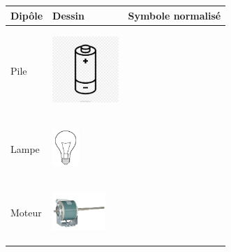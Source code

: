 \documentclass[11pt]{article}
\begin{document}
		\begin{center}
			
		\begin{tabular}{ |p{6cm}|p{6cm}|p{6cm}|  }
			\hline
			Dipôle 						& Dessin & Symbole normalisé \\\hline\hline
			Pile 						& 
			\begin{minipage}{.3\textwidth}
				\begin{center}
					\includegraphics[width=2.5cm]{pile.jpg}
				\end{center}
			  \end{minipage} &  \\\hline

			Lampe 	&
			\begin{minipage}{.3\textwidth}
				\begin{center}
					\includegraphics[width=1cm]{lampe.jpg}
				\end{center}
			  \end{minipage} &  \\\hline

			Moteur	& 
			\begin{minipage}{.3\textwidth}
				\begin{center}
					\includegraphics[width=2cm]{moteur.jpg}
				\end{center}
			  \end{minipage}  &  \\\hline


\end{tabular}
\end{center}
\end{document}
